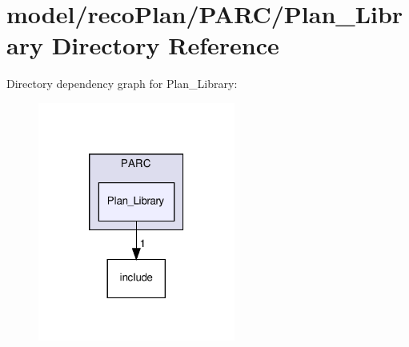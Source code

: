 \section{model/reco\+Plan/\+P\+A\+R\+C/\+Plan\+\_\+\+Library Directory Reference}
\label{dir_62d7fe3558cad42cdf68be88e8d2c7f2}
Directory dependency graph for Plan\+\_\+\+Library\+:
\nopagebreak
\begin{figure}[H]
\begin{center}
\leavevmode
\includegraphics[width=184pt]{dir_62d7fe3558cad42cdf68be88e8d2c7f2_dep}
\end{center}
\end{figure}
